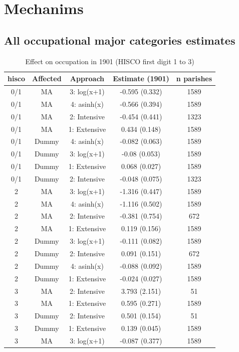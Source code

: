\section{Mechanims}

\FloatBarrier
\subsection{All occupational major categories estimates} 
\begin{table}[]
    \centering
    \caption{\label{tab:occ1} Effect on occupation in 1901 (HISCO first digit 1 to 3)}
    \footnotesize
    \begin{tabular}{ccccc}
\toprule
hisco & Affected & Approach & Estimate (1901) & n parishes\\
\midrule
0/1 & MA & 3: log(x+1) & -0.595 (0.332) & 1589\\
0/1 & MA & 4: asinh(x) & -0.566 (0.394) & 1589\\
0/1 & MA & 2: Intensive & -0.454 (0.441) & 1323\\
0/1 & MA & 1: Extensive & 0.434 (0.148) & 1589\\
0/1 & Dummy & 4: asinh(x) & -0.082 (0.063) & 1589\\
0/1 & Dummy & 3: log(x+1) & -0.08 (0.053) & 1589\\
0/1 & Dummy & 1: Extensive & 0.068 (0.027) & 1589\\
0/1 & Dummy & 2: Intensive & -0.048 (0.075) & 1323\\
2 & MA & 3: log(x+1) & -1.316 (0.447) & 1589\\
2 & MA & 4: asinh(x) & -1.116 (0.502) & 1589\\
2 & MA & 2: Intensive & -0.381 (0.754) & 672\\
2 & MA & 1: Extensive & 0.119 (0.156) & 1589\\
2 & Dummy & 3: log(x+1) & -0.111 (0.082) & 1589\\
2 & Dummy & 2: Intensive & 0.091 (0.151) & 672\\
2 & Dummy & 4: asinh(x) & -0.088 (0.092) & 1589\\
2 & Dummy & 1: Extensive & -0.024 (0.027) & 1589\\
3 & MA & 2: Intensive & 3.793 (2.151) & 51\\
3 & MA & 1: Extensive & 0.595 (0.271) & 1589\\
3 & Dummy & 2: Intensive & 0.501 (0.154) & 51\\
3 & Dummy & 1: Extensive & 0.139 (0.045) & 1589\\
3 & MA & 3: log(x+1) & -0.087 (0.377) & 1589\\

\end{tabular}
\end{table}
